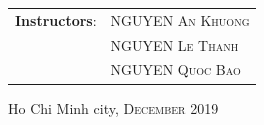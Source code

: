 \begin{titlingpage}
\begin{singlespace}
\begin{center}
\vspace{10mm}
\begin{center}
\begin{tabular}{ r l }
\textbf{Instructors}:& \Large \textsc{NGUYEN An Khuong}\\
& \Large \textsc{NGUYEN Le Thanh}\\
& \Large \textsc{NGUYEN Quoc Bao}\\
\end{tabular}
\end{center}
\vspace{6mm}
{\large Ho Chi Minh city, \textsc{December 2019}}
\vspace{12mm}
\end{center}
\end{singlespace}
\end{titlingpage}

